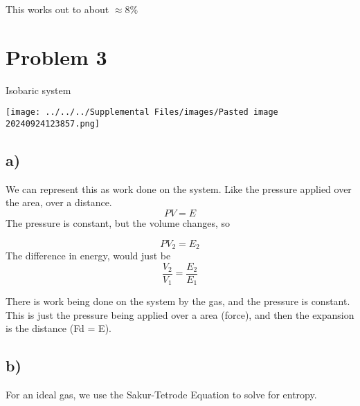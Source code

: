 \documentclass[]{article}
\begin{document}
This works out to about \(\approx 8\%\)

\hypertarget{problem-3}{%
\section{Problem 3}\label{problem-3}}

Isobaric system

\texttt{[image: ../../../Supplemental Files/images/Pasted image 20240924123857.png]}

\hypertarget{a}{%
\subsection{a)}\label{a}}

We can represent this as work done on the system. Like the pressure
applied over the area, over a distance. \[
PV = E
\] The pressure is constant, but the volume changes, so

\[
PV_{2} = E_{2}
\] The difference in energy, would just be \[
\frac{V_{2}}{V_{1}} = \frac{E_{2}}{E_{1}}
\]

There is work being done on the system by the gas, and the pressure is
constant. This is just the pressure being applied over a area (force),
and then the expansion is the distance (Fd = E).

\hypertarget{b}{%
\subsection{b)}\label{b}}

For an ideal gas, we use the Sakur-Tetrode Equation to solve for
entropy.
\end{document}
